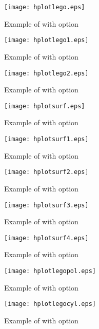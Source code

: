 \begin{figure}[p]
\begin{center} \texttt{[image: hplotlego.eps]}\end{center}
\caption{Example of \protect{} with \protect{} option}
\begin{center} \texttt{[image: hplotlego1.eps]}\end{center}
\caption{Example of \protect{} with \protect{} option}
\end{figure}

\begin{figure}[p]
\begin{center} \texttt{[image: hplotlego2.eps]}\end{center}
\caption{Example of \protect{} with \protect{} option}
\begin{center} \texttt{[image: hplotsurf.eps]}\end{center}
\caption{Example of \protect{} with \protect{} option}
\end{figure}

\begin{figure}[p]
\begin{center} \texttt{[image: hplotsurf1.eps]}\end{center}
\caption{Example of \protect{} with \protect{} option}
\begin{center} \texttt{[image: hplotsurf2.eps]}\end{center}
\caption{Example of \protect{} with \protect{} option}
\end{figure}

\begin{figure}[p]
\begin{center} \texttt{[image: hplotsurf3.eps]}\end{center}
\caption{Example of \protect{} with \protect{} option}
\begin{center} \texttt{[image: hplotsurf4.eps]}\end{center}
\caption{Example of \protect{} with \protect{} option}
\end{figure}

\begin{figure}[p]
\begin{center} \texttt{[image: hplotlegopol.eps]}\end{center}
\caption{Example of \protect{} with \protect{} option}
\begin{center} \texttt{[image: hplotlegocyl.eps]}\end{center}
\caption{Example of \protect{} with \protect{} option}
\end{figure}

